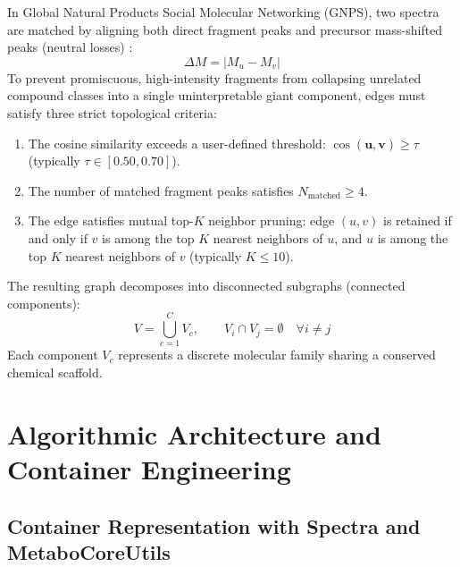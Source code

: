 \documentclass[11pt,twoside,openright]{book}
\begin{document}
In Global Natural Products Social Molecular Networking (GNPS), two spectra are matched by aligning both direct fragment peaks and precursor mass-shifted peaks (neutral losses) \cite{wang2016sharing}:
\begin{equation}
\Delta M = |M_u - M_v|
\end{equation}
To prevent promiscuous, high-intensity fragments from collapsing unrelated compound classes into a single uninterpretable giant component, edges must satisfy three strict topological criteria:
\begin{enumerate}
    \item The cosine similarity exceeds a user-defined threshold: $\cos(\mathbf{u}, \mathbf{v}) \ge \tau$ (typically $\tau \in [0.50, 0.70]$).
    \item The number of matched fragment peaks satisfies $N_{\text{matched}} \ge 4$.
    \item The edge satisfies mutual top-$K$ neighbor pruning: edge $(u, v)$ is retained if and only if $v$ is among the top $K$ nearest neighbors of $u$, and $u$ is among the top $K$ nearest neighbors of $v$ (typically $K \le 10$).
\end{enumerate}

The resulting graph decomposes into disconnected subgraphs (connected components):
\begin{equation}
V = \bigcup_{c=1}^C V_c, \qquad V_i \cap V_j = \emptyset \quad \forall i \ne j
\label{eq:connected_components}
\end{equation}
Each component $V_c$ represents a discrete molecular family sharing a conserved chemical scaffold.

\section{Algorithmic Architecture and Container Engineering}

\subsection{Container Representation with Spectra and MetaboCoreUtils}
\end{document}
